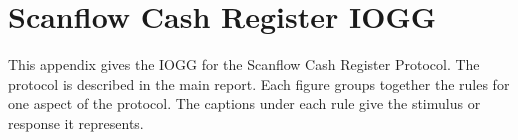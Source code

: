 \documentclass[a4paper]{report}
\begin{document}
  \newpage
  \chapter*{Scanflow Cash Register IOGG}\label{app:scrp-gg}
  This appendix gives the IOGG for the Scanflow Cash Register Protocol. The protocol is described in the main report. Each figure groups together the rules for one aspect of the protocol. The captions under each rule give the stimulus or response it represents.
  
\end{document}
